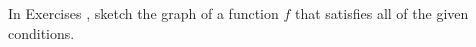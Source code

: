 {\noindent In Exercises}
{, sketch the graph of a function $f$ that satisfies all of the given conditions.}
